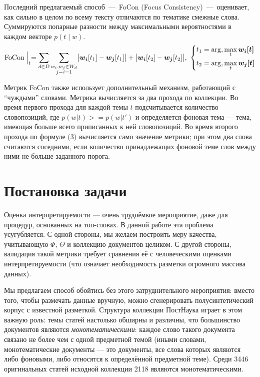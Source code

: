   Последний предлагаемый способ~---~FoCon (Focus Consistency)~---~оценивает, как сильно в целом по всему тексту отличаются по тематике смежные слова. Суммируются попарные разности между максимальными вероятностями в каждом векторе $p(t\mid w)$.
  \begin{equation}
    \text{FoCon} \Bigm|_{t} = \sum\limits_{d \in D}\sum\limits_{\substack{w_i, w_j \in W_d\\j-i=1}}
      \bigl|\bsym{w_i}[t_1] - \bsym{w_j}[t_1]\bigr| + \bigl|\bsym{w_i}[t_2] - \bsym{w_j}[t_2]\bigr|,\ 
      \left\{\begin{aligned}
        &t_1 = \arg,\max\limits_t \bsym{w_i[t]}\\
        &t_2 = \arg,\max\limits_t \bsym{w_j[t]}
      \end{aligned}\right.
    \label{coh:focon}
  \end{equation}

Метрик FoCon также использует дополнительный механизм, работающий с ``чуждыми'' словами. Метрика вычисляется за два прохода по коллекции. Во время первого прохода для каждой темы $t$ подсчитывается количество словопозиций, где $p(w|t) >= p(w|t')$ и определяется фоновая тема --- тема, имеющая больше всего приписанных к ней словопозиций. Во время второго прохода по формуле (3) вычисляется само значение метрики; при этом два слова считаются соседними, если количество принадлежащих фоновой теме слов между ними не больше заданного порога. 
\section{Постановка задачи}

Оценка интерпретируемости --- очень трудоёмкое мероприятие, даже для процедур, основанных на топ-словах. 
В данной работе эта проблема усугубляется. С одной стороны, мы желаем построить меру качества, учитывающую $\Phi$, $\Theta$ и коллекцию документов целиком. С другой стороны, валидация такой метрики требует сравнения её с человеческими оценками интерпретируемости (что означает необходимость разметки огромного массива данных).

Мы предлагаем способ обойтись без этого затруднительного мероприятия: вместо того, чтобы размечать данные вручную, можно сгенерировать полусинтетический корпус с известной разметкой. Структура коллекции ПостНаука играет в этом важную роль: темы статей настолько обширны и различны, что большинство документов являются \textit{монотематическими}: каждое слово такого документа связано не более чем с одной предметной темой (иными словами, монотематические документы --- это документы, все слова которых являются либо фоновыми, либо относятся к определённой предметной теме). Среди 3446 оригинальных статей исходной коллекции 2118 являются монотематическими. 

